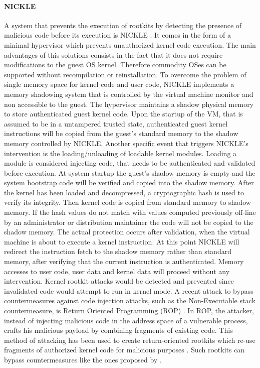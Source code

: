 \paragraph{NICKLE}
A system that prevents the execution of rootkits by detecting the presence of malicious code before its execution is NICKLE \cite{NICKLE}. It comes in the form of a minimal hypervisor which prevents unauthorized kernel code execution. The main advantages of this solutions consists in the fact that it does not require modifications to the guest OS kernel. Therefore commodity OSes can be supported without recompilation or reinstallation. 
To overcome the problem of single memory space for kernel code and user code, NICKLE implements a memory shadowing system that is controlled by the virtual machine monitor and non accessible to the guest. 
The hypervisor maintains a shadow physical memory to store authenticated guest kernel code. Upon the startup of the VM, that is assumed to be in a untampered trusted state, authenticated guest kernel instructions will be copied from the guest's standard memory to the shadow memory controlled by NICKLE. Another specific event that triggers NICKLE's intervention is the loading/unloading of loadable kernel modules. Loading a module is  considered injecting code, that needs to be authenticated and validated before execution. 
At system startup the guest's shadow memory is empty and the system bootstrap code will be verified and copied into the shadow memory. After the kernel has been loaded and decompressed, a cryptographic hash is used to verify its integrity. Then kernel code is copied from standard memory to shadow memory. If the hash values do not match with values computed previously off-line by an administrator or distribution maintainer the code will not be copied to the shadow memory.
The actual protection occurs after validation, when the virtual machine is about to execute a kernel instruction. At this point NICKLE will redirect the instruction fetch to the shadow memory rather than standard memory, after verifying that the current instruction is authenticated. 
Memory accesses to user code, user data and kernel data will proceed without any intervention. 
Kernel rootkit attacks would be detected and prevented since invalidated code would attempt to run in kernel mode.   
A recent attack to bypass countermeasures against code injection attacks, such as the Non-Executable stack countermeasure, is Return Oriented Programming (ROP) \cite{geometry}. In ROP, the attacker, instead of injecting malicious code in the address space of a vulnerable process, crafts his malicious payload by combining fragments of existing code. This method of attacking has been used to create return-oriented rootkits which
re-use fragments of authorized kernel code for malicious purposes \cite{Hund2009}. 
Such rootkits can bypass countermeasures like the ones proposed by \cite{NICKLE, SecVisor}.


